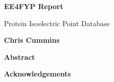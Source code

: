 \thispagestyle{plain}
\begin{center}
  \Large
  \textbf{EE4FYP Report}

  \vspace{0.4cm}
  \large
  Protein Isoelectric Point Database

  \vspace{0.4cm}
  \textbf{Chris Cummins}

  \vspace{0.9cm}
  \textbf{Abstract}
\end{center}

\lipsum[1-3]

\begin{center}
    \large
    \vspace{0.9cm}
    \textbf{Acknowledgements}
\end{center}

\lipsum[4]

\newpage
